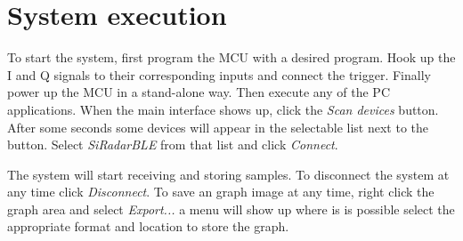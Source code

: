 \section{System execution}

To start the system, first program the MCU with a desired program. Hook up the I and Q signals to their corresponding inputs and connect the trigger. Finally power up the MCU in a stand-alone way.
Then execute any of the PC applications. When the main interface shows up, click the \textit{Scan devices} button. After some seconds some devices will appear in the selectable list next to the button. Select \textit{SiRadarBLE} from that list and click \textit{Connect}.

The system will start receiving and storing samples. To disconnect the system at any time click \textit{Disconnect}. To save an graph image at any time, right click the graph area and select \textit{Export...} a menu will show up where is is possible select the appropriate format and location to store the graph.